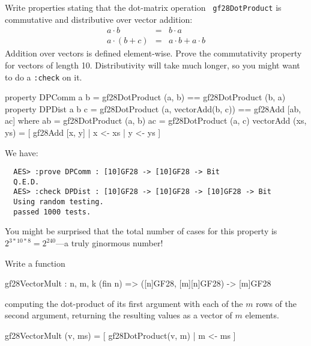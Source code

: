 \begin{Exercise}\label{ex:aesmc:1}
  Write properties stating that the dot-matrix operation {\tt
    gf28DotProduct} is commutative and distributive over vector
  addition:
\begin{eqnarray*}
a \cdot b &=& b \cdot a \\
a \cdot (b + c) &=& a\cdot b + a\cdot b
\end{eqnarray*}
Addition over vectors is defined element-wise. Prove the commutativity
property for vectors of length 10.  Distributivity will take much
longer, so you might want to do a {\tt :check} on it.\indCmdCheck
{}
\end{Exercise}
\begin{Answer}
\begin{code}
  property DPComm a b =     gf28DotProduct (a, b) == gf28DotProduct (b, a)
  property DPDist a b c =   gf28DotProduct (a, vectorAdd(b, c)) ==
                            gf28Add [ab, ac]
     where   ab = gf28DotProduct (a, b)
             ac = gf28DotProduct (a, c)
             vectorAdd (xs, ys) = [ gf28Add [x, y] | x <- xs
                                                   | y <- ys
                                  ]
\end{code}
We have:
\begin{Verbatim}
  AES> :prove DPComm : [10]GF28 -> [10]GF28 -> Bit
  Q.E.D.
  AES> :check DPDist : [10]GF28 -> [10]GF28 -> [10]GF28 -> Bit
  Using random testing.
  passed 1000 tests.
\end{Verbatim}
You might be surprised that the total number of cases for this
property is $2^{3*10*8} = 2^{240}$---a truly ginormous number!
\end{Answer}

\begin{Exercise}\label{ex:aesmc:2}
Write a function
\begin{code}
  gf28VectorMult : {n, m, k} (fin n) => ([n]GF28, [m][n]GF28) ->
                                         [m]GF28
\end{code}
computing the dot-product of its first argument with each of the $m$
rows of the second argument, returning the resulting values as a
vector of $m$ elements.
\end{Exercise}
\begin{Answer}
\begin{code}
  gf28VectorMult (v, ms) = [ gf28DotProduct(v, m) | m <- ms ]
\end{code}
\end{Answer}

